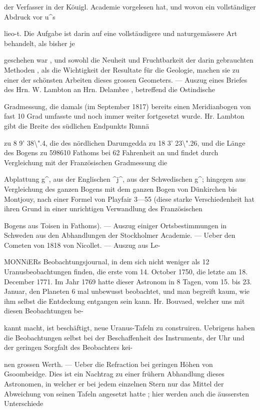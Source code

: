 \documentclass[10pt,a4paper]{article}
\begin{document}
der Verfasser in der Köuigl. Academie vorgelesen hat, und wovon ein vollständiger Abdruck vor u\textasciicircum{}s

lieo-t. Die Aufgabe ist darin auf eine vollstäudigere und naturgemässere Art behandelt, als bisher je

geschehen war , und sowohl die Neuheit und Fruchtbarkeit der darin gebrauchten Methoden , als die Wichtigkeit der Resultate für die Geologie, machen sie zu einer der schönsten Arbeiten dieses grossen Geometers. — Auszug eines Briefes des Hrn. W. Lambton an Hrn. Delambre , betreffend die Ostindische

Gradmessung, die damals (im September 1817) bereits einen Meridianbogen von fast 10 Grad umfasste und noch immer weiter fortgesetzt wurde. Hr. Lambton gibt die Breite des südlichen Endpunkts Runnä

zu 8\textdegree{} 9' 38\textbackslash{}".4, die des nördlichen Darumgedda zu 18\textdegree{} 3' 23\textbackslash{}".26, und die Länge des Bogens zu 598610 Fathoms bei 62\textdegree{} Fahrenheit an und findet durch Vergleichung mit der Französischen Gradmessung die

Abplattung g\textasciicircum{}, aus der Englischen \textasciicircum{}j\textasciicircum{}, aus der Schwedischen g\textasciicircum{}; hingegen aus Vergleichung des ganzen Bogens mit dem ganzen Bogen von Dünkirchen bis Montjouy, nach einer Formel von Playfair 3—55 (diese starke Verschiedenheit hat ihren Grund in einer unrichtigen Verwandlung des Französischen

Bogens aus Toisen in Fathoms). — Auszug einiger Ortsbestimmungen in Schweden aus den Abhandlungen der Stockholmer Academie. — Ueber den Cometen von 1818 von Nicollet. — Auszug aus Le-

MONNiERs Beobachtungsjournal, in dem sich nicht weniger als 12 Uranusbeobachtungen finden, die erste vom 14. October 1750, die letzte am 18. December 1771. Im Jahr 1769 hatte dieser Astronom in 8 Tagen, vom 15. bis 23. Januar, den Planeten 6 mal unbewusst beobachtet, und man begreift kaum, wie ihm selbst die Entdeckung entgangen sein kann. Hr. Bouvaed, welcher uns mit diesen Beobachtungen be-

kannt macht, ist beschäftigt, neue Uranus-Tafeln zu construiren. Uebrigens haben die Beobachtungen selbst bei der Beschaffenheit des Instruments, der Uhr und der geringen Sorgfalt des Beobachters kei-

nen grossen Werth. — Ueber die Refraction bei geringen Höhen von Gsoombeidge. Dies ist ein Nachtrag zu einer frühern Abhandlung dieses Astronomen, in welcher er bei jedem einzelnen Stern nur das Mittel der Abweichung von seinen Tafeln angesetzt hatte ; hier werden auch die äussersten Unterschiede
\end{document}
